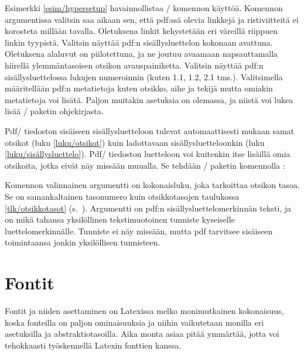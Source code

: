 Esimerkki \ref{esim/hypersetup} havainnollistaa \-/
komennon käyttöä. Komennon argumentissa valitsin  saa
aikaan sen, että pdf:ssä olevia linkkejä ja ristiviitteitä ei korosteta
millään tavalla. Oletuksena linkit kehystetään eri väreillä riippuen
linkin tyypistä. Valitsin  näyttää pdf:n
sisällysluettelon kokonaan avattuna. Oletuksena alaluvut on
piilotettuna, ja ne joutuu avaamaan napsauttamalla hiirellä
ylemmäntasoisen otsikon avauspainiketta. Valitsin
 näyttää pdf:n sisällysluettelossa lukujen
numeroinnin (kuten 1.1, 1.2, 2.1 tms.). Valitsimella 
määritellään pdf:n metatietoja kuten otsikko, aihe ja tekijä mutta
omiakin metatietoja voi lisätä. Paljon muitakin asetuksia on olemassa,
ja niistä voi lukea lisää \-/ paketin ohjekirjasta.

Pdf\-/ tiedoston sisäiseen sisällysluetteloon tulevat automaattisesti
mukaan samat otsikot (luku \ref{luku/otsikot}) kuin ladottavaan
sisällysluetteloonkin (luku \ref{luku/sisällysluettelo}). Pdf\-/
tiedoston luetteloon voi kuitenkin itse lisäillä omia otsikoita, jotka
eivät näy missään muualla. Se tehdään \-/ paketin
komennolla :

\begin{koodilohkosis}
\end{koodilohkosis}

\noindent
Komennon valinnainen argumentti  on kokonaisluku, joka
tarkoittaa otsikon tasoa. Se on samankaltainen tasonumero kuin
otsikkotasojen taulukossa \ref{tlk/otsikkotasot}
(s.~\pageref{tlk/otsikkotasot}). Argumentti  on pdf:n
sisällysluettelomerkinnän teksti, ja  on mikä tahansa
yksilöllinen tekstimuotoinen tunniste kyseiselle luettelomerkinnälle.
Tunniste ei näy missään, mutta pdf tarvitsee sisäiseen toimintaansa
jonkin yksilöllisen tunnisteen.

\section{Fontit}
\label{luku/kirjaintyypit}

Fontit ja niiden asettaminen on Latexissa melko monimutkainen
kokonaisuus, koska fonteilla on paljon ominaisuuksia ja niihin
vaikutetaan monilla eri asetuksilla ja abstraktiotasoilla. Aika monta
asiaa pitää ymmärtää, jotta voi tehokkaasti työskennellä Latexin
fonttien kanssa.


